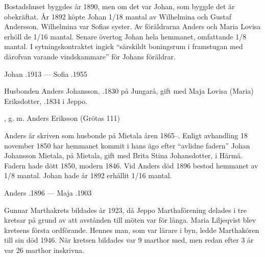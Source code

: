 Bostadshuset byggdes år 1890, men om det var Johan, som byggde det är obekräftat. År 1892 köpte Johan 1/18 mantal av Wilhelmina och Gustaf Andersson. Wilhelmina var Sofias syster. Av föräldrarna Anders och Maria Lovisa erhöll de 1/16 mantal. Senare övertog Johan hela hemmanet, omfattande 1/8 mantal. I sytningskontraktet ingick ``särskildt boningsrum i framstugan med därofvan varande vindskammare'' för Johans föräldrar.

Johan .1913  ---  Sofia .1955


%
Husbonden Anders Johansson,  .1830 på Jungarå, gift med Maja Lovisa (Maria) Eriksdotter, .1834 i Jeppo.
\begin{jhchildren}
  \item {}
  \item {}
  \item {}
  \item {}
  \item {}
  \item {}, g. m. Anders Eriksson (Grötas 111)
  \item {}
\end{jhchildren}

Anders är skriven som husbonde på Mietala åren 1865--. Enligt avhandling 18 november 1850 har hemmanet kommit i hans ägo efter	``avlidne fadern'' Johan Johansson Mietala,  på Mietala, gift med Brita Stina Johansdotter,  i Härmä. Fadern hade dött 1850, modern 1846.	Vid Anders död 1896 bestod hemmanet av 1/8 mantal. Johan hade år 1892 erhållit 1/16 mantal.

Anders .1896  ---  Maja .1903



%

%
Gunnar Marthakrets bildades år 1923, då Jeppo Marthaförening delades i tre kretsar på grund av att avstånden till möten var för långa. Maria Liljeqvist blev kretsens första ordförande. Hennes man, som var lärare i byn, ledde Marthakören till sin död 1946. När kretsen bildades var 9 marthor med, men redan efter 3 år var 26 marthor inskrivna.


